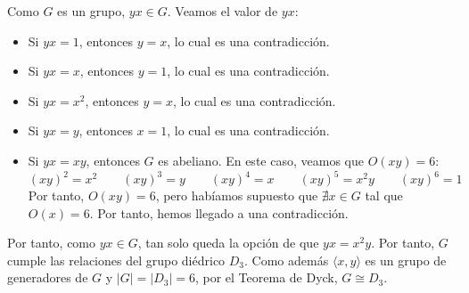 \begin{ejercicio}
\begin{enumerate}
\begin{itemize}
\begin{itemize}
                Como $G$ es un grupo, $yx\in G$. Veamos el valor de $yx$:
                \begin{itemize}
                    \item Si $yx=1$, entonces $y=x$, lo cual es una contradicción.
                    \item Si $yx=x$, entonces $y=1$, lo cual es una contradicción.
                    \item Si $yx=x^2$, entonces $y=x$, lo cual es una contradicción.
                    \item Si $yx=y$, entonces $x=1$, lo cual es una contradicción.
                    \item Si $yx=xy$, entonces $G$ es abeliano. En este caso, veamos que $O(xy)=6$:
                    \begin{equation*}
                        (xy)^2=x^2\qquad 
                        (xy)^3=y\qquad 
                        (xy)^4=x\qquad 
                        (xy)^5=x^2y\qquad 
                        (xy)^6=1
                    \end{equation*}
                    Por tanto, $O(xy)=6$, pero habíamos supuesto que $\nexists x\in G$ tal que $O(x)=6$. Por tanto, hemos llegado a una contradicción.
                \end{itemize}

                Por tanto, como $yx\in G$, tan solo queda la opción de que $yx=x^2y$. Por tanto, $G$ cumple las relaciones del grupo diédrico $D_3$. Como además $\langle x,y\rangle$ es un grupo de generadores de $G$ y $|G|=|D_3|=6$, por el Teorema de Dyck, $G\cong D_3$.
            \end{itemize}
        \end{itemize}
    \end{enumerate}
\end{ejercicio}

